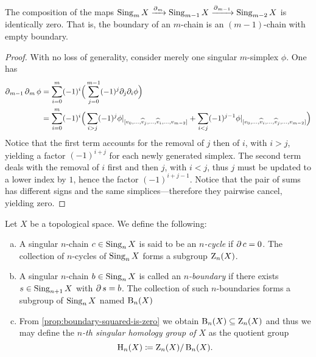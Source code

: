 \begin{proposition}
\label{prop:boundary-squared-is-zero}
The composition of the maps
\(\operatorname{Sing}_m X \xrightarrow{\operatorname{\partial}_m} \operatorname{Sing}_{m-1} X \xrightarrow{\operatorname{\partial}_{m-1}}
\operatorname{Sing}_{m-2} X\) is identically zero. That is, the boundary of an \(m\)-chain is
an \((m-1)\)-chain with empty boundary.
\end{proposition}

\begin{proof}
With no loss of generality, consider merely one singular \(m\)-simplex
\(\phi\). One has
\begin{align*}
  \operatorname{\partial}_{m-1} \operatorname{\partial}_m \phi
  &= \sum_{i=0}^m (-1)^i
  \Big( \sum_{j=0}^{m-1} (-1)^j \partial_j \partial_i \phi \Big) \\
  &= \sum_{i=0}^m (-1)^i
  \Big(
    \sum_{i > j} (-1)^j
    \phi|_{[v_0, \dots, \widehat v_j, \dots, \widehat v_i, \dots, v_{m-2}]}
  + \sum_{i < j} (-1)^{j-1}
      \phi|_{[v_0, \dots, \widehat v_i, \dots, \widehat v_j, \dots, v_{m-2}]}
      \Big) \\
\end{align*}
Notice that the first term accounts for the removal of \(j\) then of \(i\), with
\(i > j\), yielding a factor \((-1)^{i + j}\) for each newly generated
simplex. The second term deals with the removal of \(i\) first and then \(j\),
with \(i < j\), thus \(j\) must be updated to a lower index by \(1\), hence the
factor \((-1)^{i + j - 1}\). Notice that the pair of sums has different signs
and the same simplices---therefore they pairwise cancel, yielding zero.
\end{proof}

\begin{definition}
\label{def:cycle-boundary-homology}
Let \(X\) be a topological space. We define the following:
\begin{enumerate}[(a)]\setlength\itemsep{0em}
\item A singular \(n\)-chain \(c \in \operatorname{Sing}_n X\) is said to be an
  \emph{\(n\)-cycle} if \(\operatorname{\partial} c = 0\). The collection of \(n\)-cycles of
  \(\operatorname{Sing}_n X\) forms a subgroup \(\operatorname{Z}_n(X)\).

\item A singular \(n\)-chain \(b \in \operatorname{Sing}_n X\) is called an
  \emph{\(n\)-boundary} if there exists \(s \in \operatorname{Sing}_{n+1} X\) with
  \(\operatorname{\partial} s = b\). The collection of such \(n\)-boundaries forms a subgroup of
  \(\operatorname{Sing}_n X\) named \(\operatorname{B}_n(X)\)

\item From \cref{prop:boundary-squared-is-zero} we obtain
  \(\operatorname{B}_n(X) \subseteq \operatorname{Z}_n(X)\) and thus we may define the \emph{\(n\)-th
    singular homology group of \(X\)} as the quotient group
  \[
  \operatorname{H}_n(X) \coloneq \operatorname{Z}_n(X) / \operatorname{B}_n(X).
  \]
\end{enumerate}
\end{definition}

